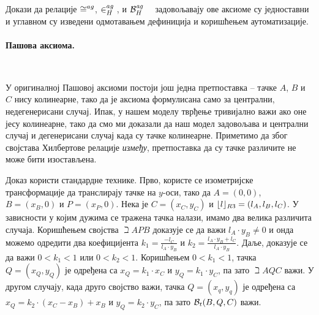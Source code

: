Докази да релације $\agcongr{}{}{}$, $ \in^{ag}_H {}$, и $\mathcal{B}_H^{\mathit{ag}}\ \ \ $
задовољавају ове аксиоме су једноставни и углавном су изведени
одмотавањем дефиниција и коришћењем аутоматизације.

\paragraph{Пашова аксиома.}

{\tt
\begin{tabbing}
\hspace{10mm}\=assumes\ \=\kill
\textbf{lemma} "}$A \neq B\,\wedge\,B \neq C\,\wedge\,C \neq A\,\wedge\,\beth{A}{P}{B}\,\wedge$\\
\>$\,\inh{P}{l}\,\wedge\,\neg \inh{C}{l}\,\wedge\,\neg \inh{A}{l}\,\wedge\,\neg \inh{B}{l}h\ \longrightarrow$\\
\>\>$\exists Q.\ (\beth{A}{Q}{C}\  \wedge\ \inh{Q}{l})\ \vee\
               (\beth{B}{Q}{C}\  \wedge\  \inh{Q}{l})$"}
\end{tabbing}
}

\begin{center}

\end{center}

У оригиналној Пашовој аксиоми постоји још једна претпоставка -- тачке
$A$, $B$ и $C$ нису колинеарне, тако да је аксиома формулисана само за
централни, недегенерисани случај. Ипак, у нашем моделу тврђење
тривијално важи ако оне јесу колинеарне, тако да смо ми доказали да
наш модел задовољава и централни случај и дегенерисани случај када су
тачке колинеарне. Приметимо да због својстава Хилбертове релације
\emph{између}, претпоставка да су тачке различите не може бити
изостављена.

Доказ користи стандардне технике. Прво, користе се изометријске
трансформације да транслирају тачке на $y$-оси, тако да $A = (0, 0)$,
$B = (x_B, 0)$ и $P = (x_P, 0)$. Нека је $C = (x_C, y_C)$ и
$\lfloor l\rfloor_{R3} = (l_A, l_B, l_C)$. У зависности у
којим дужима се тражена тачка налази, имамо два велика различита
случаја. Коришћењем својства $\beth{A}{P}{B}$ доказује се да важи
$l_A\cdot y_B \neq 0$ и онда можемо одредити два коефицијента $k_1 =
\frac{-l_C}{l_A\cdot y_B}$ и $k_2 = \frac{l_A\cdot y_B + l_C}{l_A\cdot
  y_B}$.  Даље, доказује се да важи $0 < k_1 < 1$ или $0 < k_2 <
1$. Коришћењем $0 < k_1 < 1$, тачка $Q = (x_Q, y_Q)$ је одређена са
$x_Q = k_1\cdot x_C$ и $y_Q = k_1\cdot y_C$, па зато $\beth{A}{Q}{C}$
важи. У другом случају, када друго својство важи, тачка $Q=(x_q, y_q)$
је одређена са $x_Q = k_2\cdot (x_C - x_B) + x_B$ и $y_Q = k_2\cdot
y_C$, па зато $\mathcal{B}_t(B, Q, C)$ важи.

